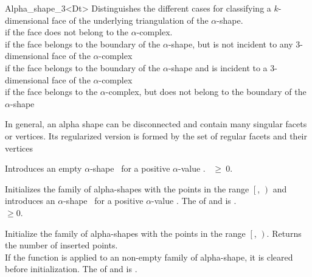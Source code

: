 \begin{ccRefClass} {Alpha_shape_3<Dt>}
{Distinguishes the different cases for classifying a $k$-dimensional face
 of the underlying triangulation of the $\alpha$-shape. \\
 if the face does not belong to the $\alpha$-complex.\\
 if the face belongs to the boundary of the $\alpha$-shape,
 but is not incident to any 3-dimensional face of the $\alpha$-complex\\
 if the face belongs to the boundary of the $\alpha$-shape
 and is incident to a 3-dimensional face of the $\alpha$-complex\\
 if the face belongs to the $\alpha$-complex, but does
not belong to the boundary of the $\alpha$-shape\\}

{ In general, an alpha shape can be disconnected and contain many singular facets 
or vertices. Its regularized version is formed by the set of regular facets
and their vertices}

\ccCreation
{}

{Introduces an empty $\alpha$-shape \ccVar\ for a positive $\alpha$-value
 .
\ccPrecond {}~$\geq~0$.}


{Initializes the family of alpha-shapes with the points in the range
$\left[\right.$, $\left.\right)$ and 
introduces an $\alpha$-shape \ccVar\ for a positive $\alpha$-value
.  
\ccPrecond The  of  and
 is .\\
 $\geq 0$.}

\ccOperations

{Initialize the family of alpha-shapes with the points in the range
$\left[\right.$, $\left.\right)$. Returns the number of
inserted points. \\ 
If the function is applied to an non-empty family of alpha-shape, it is cleared
before initialization.
\ccPrecond The  of  and
 is .}


\end{ccRefClass}
